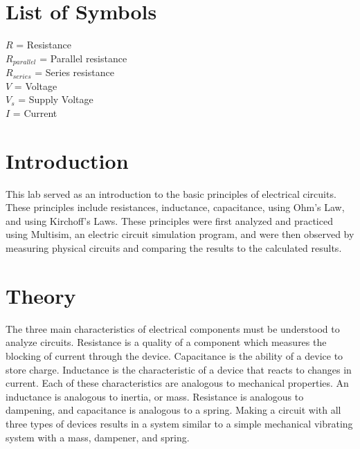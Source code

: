 \documentclass[12pt]{article}
\begin{document}

\tableofcontents

\listoffigures

\bigskip
\bigskip


\section*{\fontsize{12}{12}\selectfont \large List of Symbols}
 $R$ = Resistance\\
$R_{parallel}$ = Parallel resistance\\
$R_{series}$ = Series resistance\\
$V$ = Voltage\\
$V_{s}$ = Supply Voltage\\
$I$ = Current\\

\newpage


\section*{\fontsize{12}{12}\selectfont \large Introduction}
This lab served as an introduction to the basic principles of electrical circuits. These principles include resistances, inductance, capacitance, using Ohm's Law, and using Kirchoff's Laws. These principles were first analyzed and practiced using Multisim, an electric circuit simulation program, and were then observed by measuring physical circuits and comparing the results to the calculated results. 



\section*{\fontsize{12}{12}\selectfont \large Theory}
The three main characteristics of electrical components must be understood to analyze circuits. Resistance is a quality of a component which measures the blocking of current through the device. Capacitance is the ability of a device to store charge. Inductance is the characteristic of a device that reacts to changes in current. Each of these characteristics are analogous to mechanical properties. An inductance is analogous to inertia, or mass. Resistance is analogous to dampening, and capacitance is analogous to a spring. Making a circuit with all three types of devices results in a system similar to a simple mechanical vibrating system with a mass, dampener, and spring. 
\bigskip
\end{document}
